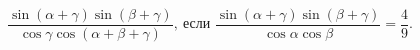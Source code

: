 \begin{ex}[type=equation]
	\begin{condition}
		$\ \dfrac{\sin {(\alpha + \gamma)\sin {(\beta + \gamma)}}}{\cos \gamma \cos {(\alpha+\beta + \gamma)}},\ $если $\dfrac{\sin{(\alpha + \gamma)}\sin {(\beta+\gamma)}}{\cos \alpha\cos\beta} = \dfrac{4}{9}.$
	\end{condition}
\end{ex}